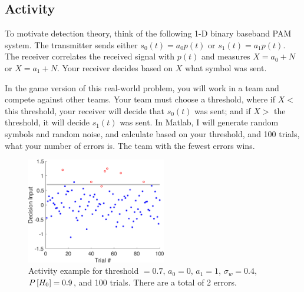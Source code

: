 


\subsection{Activity}

To motivate detection theory, think of the following 1-D binary baseband PAM system.  The transmitter sends either $s_0(t) = a_0p(t)$ or $s_1(t) = a_1p(t)$.  The receiver correlates the received signal with $p(t)$ and measures $X = a_0 + N$ or $X=a_1 + N$.  Your receiver decides based on $X$ what symbol was sent.  

In the game version of this real-world problem, you will work in a team and compete against other teams. Your team must choose a threshold, where if $X<$ this threshold, your receiver will decide that $s_0(t)$ was sent; and if $X>$ the threshold, it will decide $s_1(t)$ was sent.  In Matlab, I will generate random symbols and random noise, and calculate based on your threshold, and 100 trials, what your number of errors is.  The team with the fewest errors wins.

  \begin{figure}[htbp]
    \centerline{\includegraphics[width=2.4in]{../images/LectureActivitySymbolErrors.eps} }
    \caption{Activity example for threshold $= 0.7$, $a_0=0$, $a_1=1$, $\sigma_w=0.4$, $P\left[{H_0}\right]=0.9$, and 100 trials.  There are a total of 2 errors.}
    \label{F:LectureActivitySymbolErrors}
  \end{figure}


